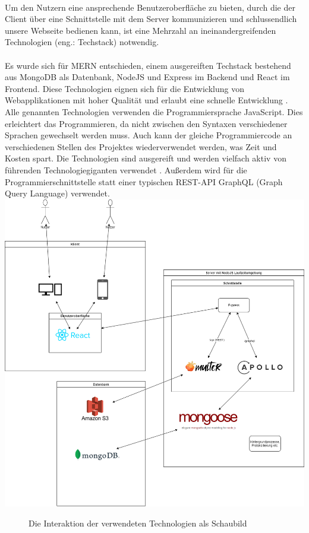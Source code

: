 \paragraph{}
Um den Nutzern eine ansprechende Benutzeroberfläche zu bieten, durch die der Client über eine Schnittstelle mit dem Server kommunizieren und schlussendlich unsere Webseite bedienen kann, ist eine Mehrzahl an ineinandergreifenden Technologien (eng.: Techstack) notwendig.

\paragraph{}
Es wurde sich für MERN entschieden, einem ausgereiften Techstack bestehend aus MongoDB als Datenbank, NodeJS und Express im Backend und React im Frontend.
Diese Technologien eignen sich für die Entwicklung von Webapplikationen mit hoher Qualität und erlaubt eine schnelle Entwicklung \cite{ti:mernStackAdvantages}.
Alle genannten Technologien verwenden die Programmiersprache JavaScript.
Dies erleichtert das Programmieren, da nicht zwischen den Syntaxen verschiedener Sprachen gewechselt werden muss.
Auch kann der gleiche Programmiercode an verschiedenen Stellen des Projektes wiederverwendet werden, was Zeit und Kosten spart.
Die Technologien sind ausgereift und werden vielfach aktiv von führenden Technologiegiganten verwendet \cite{ti:mongo}\cite{ti:express}\cite{ti:react}\cite{ti:node}.
Außerdem wird für die Programmierschnittstelle statt einer typischen REST-API GraphQL (Graph Query Language) verwendet. \\

\includegraphics[width=\textwidth]{sources/MERN-Stack_Schaubild.drawio}
\begin{figure}[ht]
	\centering
	\caption{Die Interaktion der verwendeten Technologien als Schaubild}
	\label{figMERN1}
\end{figure}

